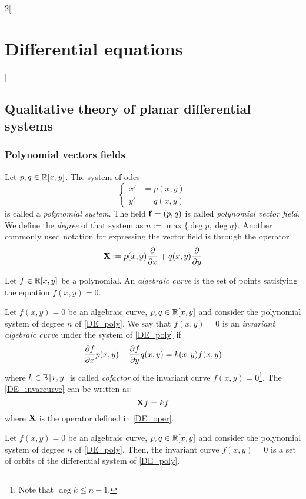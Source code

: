 \documentclass[../../../main.tex]{subfiles}
\begin{document}
\begin{multicols}{2}[\section{Differential equations}]
  \subsection{Qualitative theory of planar differential systems}
  \subsubsection{Polynomial vectors fields}
  \begin{definition}
    Let $p,q\in\mathbb{R}[x,y]$. The system of odes
    \begin{equation}\label{DE_poly}
      \left\{
      \begin{aligned}
        x' & =p(x,y) \\
        y' & =q(x,y)
      \end{aligned}
      \right.
    \end{equation}
    is called a \emph{polynomial system}. The field $\boldsymbol{\mathrm{f}}=(p,q)$ is called \emph{polynomial vector field}. We define the \emph{degree} of that system as $n:=\max\{\deg p,\deg q\}$. Another commonly used notation for expressing the vector field is through the operator
    \begin{equation}\label{DE_oper}
      \boldsymbol{\mathrm{X}}:=p(x,y)\pdv{}{x}+q(x,y)\pdv{}{y}
    \end{equation}
  \end{definition}
  \begin{definition}
    Let $f\in\mathbb{R}[x,y]$ be a polynomial. An \emph{algebraic curve} is the set of points satisfying the equation $f(x,y)=0$.
  \end{definition}
  \begin{definition}
    Let $f(x,y)=0$ be an algebraic curve, $p,q\in\mathbb{R}[x,y]$ and consider the polynomial system of degree $n$ of \cref{DE_poly}. We say that $f(x,y)=0$ is an \emph{invariant algebraic curve} under the system of \cref{DE_poly} if
    \begin{equation}\label{DE_invarcurve}
      \pdv{f}{x}(x,y)p(x,y)+\pdv{f}{y}q(x,y)=k(x,y)f(x,y)
    \end{equation}
    where $k\in\mathbb{R}[x,y]$ is called \emph{cofactor} of the invariant curve $f(x,y)=0$\footnote{Note that $\deg k\leq n-1$.}. The \cref{DE_invarcurve} can be written as: $$\boldsymbol{\mathrm{X}}f=kf$$
    where $\boldsymbol{\mathrm{X}}$ is the operator defined in \cref{DE_oper}.
  \end{definition}
  \begin{proposition}
    Let $f(x,y)=0$ be an algebraic curve, $p,q\in\mathbb{R}[x,y]$ and consider the polynomial system of degree $n$ of \cref{DE_poly}. Then, the invariant curve $f(x,y)=0$ is a set of orbits of the differential system of \cref{DE_poly}.
  \end{proposition}

\end{multicols}
\end{document}
